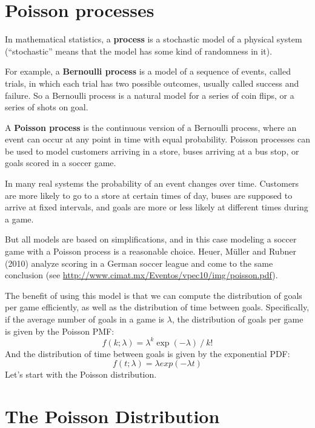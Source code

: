 \documentclass[12pt]{book}
\theoremstyle{exercise}
\begin{document}
\section{Poisson processes}

In mathematical statistics, a {\bf process} is a stochastic model of a
physical system (``stochastic'' means that the model has some kind of
randomness in it).  

For example, a {\bf Bernoulli process} is a model of a
sequence of events, called trials, in which each trial has two
possible outcomes, usually called success and failure.  
So a Bernoulli process
is a natural model for a series of coin flips, or a series of shots on
goal.   

A {\bf Poisson process} is the continuous version of a Bernoulli process,
where an event can occur at any point in time with equal probability.
Poisson processes can be used to model customers arriving in a store,
buses arriving at a bus stop, or goals scored in a soccer game.

In many real systems the probability of an event changes over time.
Customers are more likely to go to a store at certain times of day,
buses are supposed to arrive at fixed intervals, and goals are more
or less likely at different times during a game.

But all models are based on simplifications, and in this case modeling
a soccer game with a Poisson process is a reasonable choice.  Heuer,
M\"{u}ller and Rubner (2010) analyze scoring in a German soccer league
and come to the same conclusion (see
\url{http://www.cimat.mx/Eventos/vpec10/img/poisson.pdf}).

The benefit of using this model is that we can compute the distribution
of goals per game efficiently, as well as the distribution of time
between goals.  Specifically, if the average number of goals
in a game is $\lambda$, the distribution of goals per game is
given by the Poisson PMF:
%
\[ f(k; \lambda) = \lambda^k \exp(-\lambda) ~/~ k! \]
%
And the distribution of time between goals is given by the
exponential PDF:
%
\[ f(t; \lambda) = \lambda exp(-\lambda t) \]
%
Let's start with the Poisson distribution.


\section{The Poisson Distribution}
\end{document}
